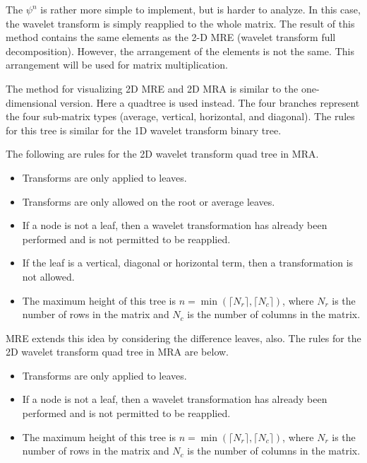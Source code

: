The $\psi^n$ is rather more simple to implement, but is harder to
analyze.  In this case, the wavelet transform is simply reapplied to
the whole matrix.  The result of this method contains the same
elements as the 2-D MRE (wavelet transform full decomposition).
However, the arrangement of the elements is not the same.  This
arrangement will be used for matrix multiplication.

The method for visualizing 2D MRE and 2D MRA is similar to the
one-dimensional version.  Here a quadtree is used instead.  The four
branches represent the four sub-matrix types (average, vertical,
horizontal, and diagonal).  The rules for this tree is similar for the
1D wavelet transform binary tree.

The following are rules for the 2D wavelet transform quad tree in MRA.
\begin{itemize}
\item Transforms are only applied to leaves.
\item Transforms are only allowed on the root or average leaves.
\item If a node is not a leaf, then a wavelet transformation has already been performed and is not permitted to be reapplied.
\item If the leaf is a vertical, diagonal or horizontal term, then a transformation is not allowed.
\item The maximum height of this tree is 
$n = \min \left( \lceil N_r \rceil, \lceil N_c \rceil \right)$,
where $N_r$ is the number of rows in the matrix and $N_c$ is the number of columns in the matrix.
\end{itemize}   

MRE extends this idea by considering the difference leaves, also.  The rules for the 2D wavelet transform quad tree in MRA are below.
\begin{itemize}
\item Transforms are only applied to leaves.
\item If a node is not a leaf, then a wavelet transformation has already been performed and is not permitted to be reapplied.
\item The maximum height of this tree is 
$n = \min \left( \lceil N_r \rceil, \lceil N_c \rceil \right)$,
where $N_r$ is the number of rows in the matrix and $N_c$ is the number of columns in the matrix.
\end{itemize}   




